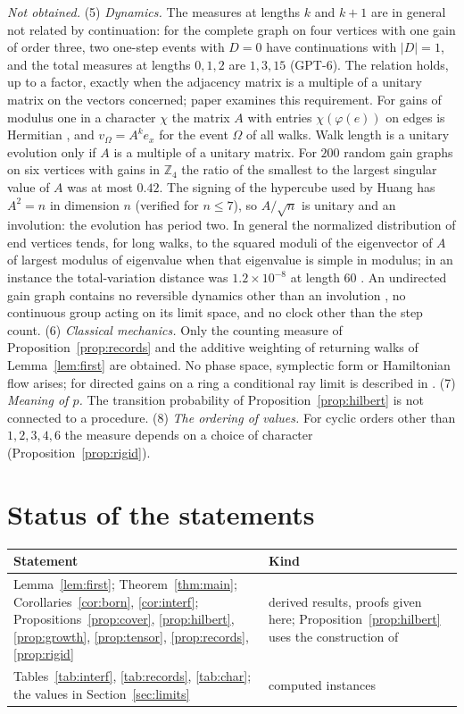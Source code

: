 \emph{Not obtained.} (5) \emph{Dynamics.} The measures at lengths $k$ and $k+1$ are in general not related by continuation: for the complete graph on four vertices with one gain of order three, two one-step events with $D=0$ have continuations with $|D|=1$, and the total measures at lengths $0,1,2$ are $1,3,15$ (GPT-6). The relation holds, up to a factor, exactly when the adjacency matrix is a multiple of a unitary matrix on the vectors concerned; paper \cite{g9} examines this requirement. For gains of modulus one in a character $\chi$ the matrix $A$ with entries $\chi(\varphi(e))$ on edges is Hermitian \cite{reff,cdd}, and $v_\Omega=A^ke_x$ for the event $\Omega$ of all walks. Walk length is a unitary evolution only if $A$ is a multiple of a unitary matrix. For $200$ random gain graphs on six vertices with gains in $\mathbb{Z}_4$ the ratio of the smallest to the largest singular value of $A$ was at most $0.42$. The signing of the hypercube used by Huang \cite{huang} has $A^2=n$ in dimension $n$ (verified for $n\le7$), so $A/\sqrt n$ is unitary and an involution: the evolution has period two. In general the normalized distribution of end vertices tends, for long walks, to the squared moduli of the eigenvector of $A$ of largest modulus of eigenvalue when that eigenvalue is simple in modulus; in an instance the total-variation distance was $1.2\times10^{-8}$ at length $60$ \cite{comp2}. An undirected gain graph contains no reversible dynamics other than an involution \cite{g9}, no continuous group acting on its limit space, and no clock other than the step count. (6) \emph{Classical mechanics.} Only the counting measure of Proposition~\ref{prop:records} and the additive weighting of returning walks of Lemma~\ref{lem:first} are obtained. No phase space, symplectic form or Hamiltonian flow arises; for directed gains on a ring a conditional ray limit is described in \cite{g9}. (7) \emph{Meaning of $p$.} The transition probability of Proposition~\ref{prop:hilbert} is not connected to a procedure. (8) \emph{The ordering of values.} For cyclic orders other than $1,2,3,4,6$ the measure depends on a choice of character (Proposition~\ref{prop:rigid}).

\section{Status of the statements}

\begin{center}\small
\begin{tabular}{@{}p{}p{}@{}}\toprule
Statement & Kind\\\midrule
Lemma~\ref{lem:first}; Theorem~\ref{thm:main}; Corollaries~\ref{cor:born}, \ref{cor:interf}; Propositions~\ref{prop:cover}, \ref{prop:hilbert}, \ref{prop:growth}, \ref{prop:tensor}, \ref{prop:records}, \ref{prop:rigid} & derived results, proofs given here; Proposition~\ref{prop:hilbert} uses the construction of \cite{djs}\\
Tables~\ref{tab:interf}, \ref{tab:records}, \ref{tab:char}; the values in Section~\ref{sec:limits} & computed instances\\\bottomrule
\end{tabular}
\end{center}

